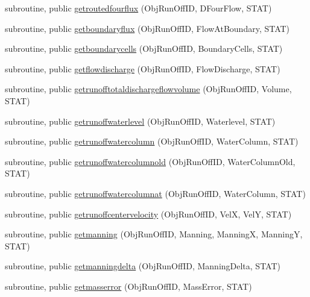 \begin{DoxyCompactItemize}
\item 
subroutine, public \mbox{\hyperlink{namespacemodulerunoff_a8e2e0bbd121e81c889fd2cd186c45b5c}{getroutedfourflux}} (Obj\+Run\+Off\+ID, D\+Four\+Flow, S\+T\+AT)
\item 
subroutine, public \mbox{\hyperlink{namespacemodulerunoff_aa5c3e304953e0e305461bb0ef472e0f8}{getboundaryflux}} (Obj\+Run\+Off\+ID, Flow\+At\+Boundary, S\+T\+AT)
\item 
subroutine, public \mbox{\hyperlink{namespacemodulerunoff_a94d1c021f061e9cfa1f07c3845541525}{getboundarycells}} (Obj\+Run\+Off\+ID, Boundary\+Cells, S\+T\+AT)
\item 
subroutine, public \mbox{\hyperlink{namespacemodulerunoff_a35dbdf0f3737830c01b78496fc043851}{getflowdischarge}} (Obj\+Run\+Off\+ID, Flow\+Discharge, S\+T\+AT)
\item 
subroutine, public \mbox{\hyperlink{namespacemodulerunoff_aa4377dd8080b614590e0609f019f9764}{getrunofftotaldischargeflowvolume}} (Obj\+Run\+Off\+ID, Volume, S\+T\+AT)
\item 
subroutine, public \mbox{\hyperlink{namespacemodulerunoff_a739d861fb3d51996841a644f1567506e}{getrunoffwaterlevel}} (Obj\+Run\+Off\+ID, Waterlevel, S\+T\+AT)
\item 
subroutine, public \mbox{\hyperlink{namespacemodulerunoff_a2f62616fa000a8f027d3557454de9b24}{getrunoffwatercolumn}} (Obj\+Run\+Off\+ID, Water\+Column, S\+T\+AT)
\item 
subroutine, public \mbox{\hyperlink{namespacemodulerunoff_a4718c4b469bb2480c20b88afa22ebc29}{getrunoffwatercolumnold}} (Obj\+Run\+Off\+ID, Water\+Column\+Old, S\+T\+AT)
\item 
subroutine, public \mbox{\hyperlink{namespacemodulerunoff_a6f2a352071be64f678c58f0707749d4f}{getrunoffwatercolumnat}} (Obj\+Run\+Off\+ID, Water\+Column, S\+T\+AT)
\item 
subroutine, public \mbox{\hyperlink{namespacemodulerunoff_af29a57ef10a724fc9c8e0a4f1f22339e}{getrunoffcentervelocity}} (Obj\+Run\+Off\+ID, VelX, VelY, S\+T\+AT)
\item 
subroutine, public \mbox{\hyperlink{namespacemodulerunoff_a2cad42fe7c6c24a46f9a75f3528e8abb}{getmanning}} (Obj\+Run\+Off\+ID, Manning, ManningX, ManningY, S\+T\+AT)
\item 
subroutine, public \mbox{\hyperlink{namespacemodulerunoff_a9ca63f5612ab734b77497c2eca2c05bd}{getmanningdelta}} (Obj\+Run\+Off\+ID, Manning\+Delta, S\+T\+AT)
\item 
subroutine, public \mbox{\hyperlink{namespacemodulerunoff_a9dff5ff4c2ef0ce7078dd08d46ddeb4b}{getmasserror}} (Obj\+Run\+Off\+ID, Mass\+Error, S\+T\+AT)

\end{DoxyCompactItemize}
